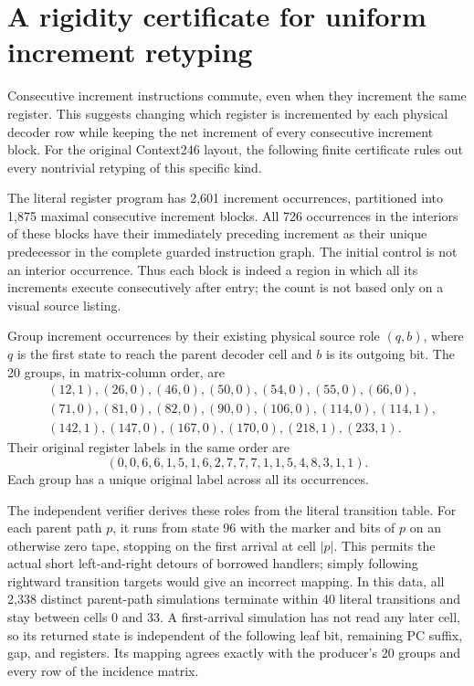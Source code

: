 \section{A rigidity certificate for uniform increment retyping}
\label{sec:increment-incidence}

Consecutive increment instructions commute, even when they increment the
same register.  This suggests changing which register is incremented by
each physical decoder row while keeping the net increment of every
consecutive increment block.  For the original Context246 layout, the
following finite certificate rules out every nontrivial retyping of this
specific kind.

The literal register program has 2,601 increment occurrences, partitioned
into 1,875 maximal consecutive increment blocks.  All 726 occurrences in
the interiors of these blocks have their immediately preceding increment
as their unique predecessor in the complete guarded instruction graph.
The initial control is not an interior occurrence.  Thus each block is
indeed a region in which all its increments execute consecutively after
entry; the count is not based only on a visual source listing.

Group increment occurrences by their existing physical source role
$(q,b)$, where $q$ is the first state to reach the parent decoder cell and
$b$ is its outgoing bit.  The 20 groups, in matrix-column order, are
\[
\begin{split}
 &(12,1),(26,0),(46,0),(50,0),(54,0),(55,0),(66,0),\\
 &(71,0),(81,0),(82,0),(90,0),(106,0),(114,0),(114,1),\\
 &(142,1),(147,0),(167,0),(170,0),(218,1),(233,1).
\end{split}
\]
Their original register labels in the same order are
\[
 (0,0,6,6,1,5,1,6,2,7,7,7,1,1,5,4,8,3,1,1).
\]
Each group has a unique original label across all its occurrences.

The independent verifier derives these roles from the literal transition
table.  For each parent path $p$, it runs from state 96 with the marker
and bits of $p$ on an otherwise zero tape, stopping on the first arrival
at cell $|p|$.  This permits the actual short left-and-right detours of
borrowed handlers; simply following rightward transition targets would
give an incorrect mapping.  In this data, all 2,338 distinct parent-path
simulations terminate within 40 literal transitions and stay between
cells 0 and 33.  A first-arrival simulation has not read any later cell,
so its returned state is independent of the following leaf bit, remaining
PC suffix, gap, and registers.  Its mapping agrees exactly with the
producer's 20 groups and every row of the incidence matrix.

